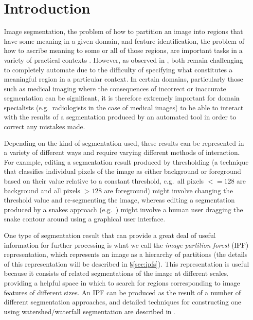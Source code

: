 \documentclass[a4paper]{article}
\begin{document}
\section{Introduction}


Image segmentation, the problem of how to partition an image into regions that have some meaning in a given domain, and feature identification, the problem of how to ascribe meaning to some or all of those regions, are important tasks in a variety of practical contexts \cite{?}. However, as observed in \cite{golodetz11}, both remain challenging to completely automate due to the difficulty of specifying what constitutes a meaningful region in a particular context. In certain domains, particularly those such as medical imaging where the consequences of incorrect or inaccurate segmentation can be significant, it is therefore extremely important for domain specialists (e.g.~radiologists in the case of medical images) to be able to interact with the results of a segmentation produced by an automated tool in order to correct any mistakes made.

Depending on the kind of segmentation used\footnotemark, these results can be represented in a variety of different ways and require varying different methods of interaction. For example, editing a segmentation result produced by thresholding (a technique that classifies individual pixels of the image as either background or foreground based on their value relative to a constant threshold, e.g.~all pixels $<= 128$ are background and all pixels $> 128$ are foreground) might involve changing the threshold value and re-segmenting the image, whereas editing a segmentation produced by a snakes approach (e.g.~\cite{kass88,lobregt95}) might involve a human user dragging the snake contour around using a graphical user interface.


One type of segmentation result that can provide a great deal of useful information for further processing is what we call the \emph{image partition forest} (IPF) representation\footnotemark, which represents an image as a hierarchy of partitions (the details of this representation will be described in \S\ref{sec:ipfs}). This representation is useful because it consists of related segmentations of the image at different scales, providing a helpful space in which to search for regions corresponding to image features of different sizes. An IPF can be produced as the result of a number of different segmentation approaches, and detailed techniques for constructing one using watershed/waterfall segmentation are described in \cite{golodetz11}.
\end{document}
